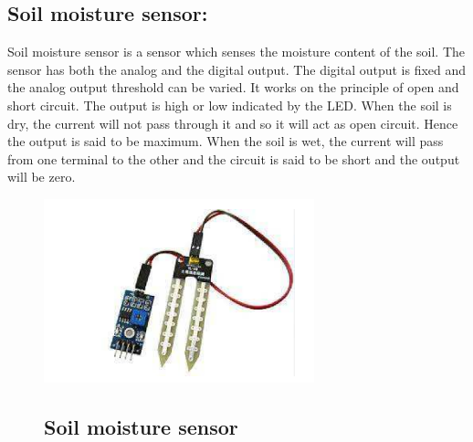 \documentclass{wsdcr}
\begin{document}
\subsection{Soil moisture sensor:}
Soil moisture sensor is a sensor which senses the moisture 
content of the soil. The sensor has both the analog and the 
digital output. The digital output is fixed and the analog 
output threshold can be varied. It works on the principle of 
open and short circuit. The output is high or low indicated 
by the LED. When the soil is dry, the current will not pass 
through it and so it will act as open circuit. Hence the output 
is said to be maximum. When the soil is wet, the current will 
pass from one terminal to the other and the circuit is said to 
be short and the output will be zero.
\begin{figure}[t!]
    \centering
    \includegraphics[width=.9\linewidth]{soil.png}
    \caption{ }
\subsection{ Soil moisture sensor }
    \label{fig:example}
\end{figure}
\end{document}
